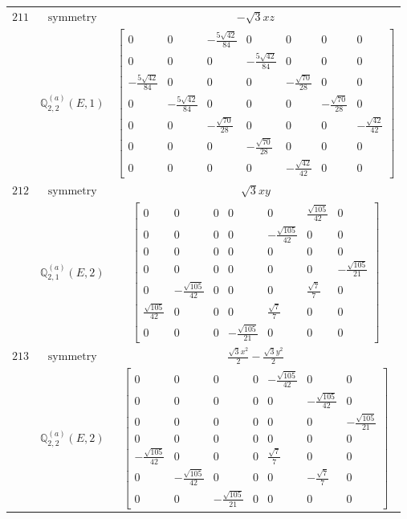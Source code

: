 \documentclass[fleqn,8pt,landscape]{jsarticle}
\begin{document}
\begin{longtable}{ccc}
$ 211 $ & $ \text{symmetry} $ & $ - \sqrt{3} x z $ \\
$  $ & $ \mathbb{Q}_{2,2}^{(a)}(E,1) $ & $ \begin{bmatrix} 0 & 0 & - \frac{5 \sqrt{42}}{84} & 0 & 0 & 0 & 0 \\ 0 & 0 & 0 & - \frac{5 \sqrt{42}}{84} & 0 & 0 & 0 \\ - \frac{5 \sqrt{42}}{84} & 0 & 0 & 0 & - \frac{\sqrt{70}}{28} & 0 & 0 \\ 0 & - \frac{5 \sqrt{42}}{84} & 0 & 0 & 0 & - \frac{\sqrt{70}}{28} & 0 \\ 0 & 0 & - \frac{\sqrt{70}}{28} & 0 & 0 & 0 & - \frac{\sqrt{42}}{42} \\ 0 & 0 & 0 & - \frac{\sqrt{70}}{28} & 0 & 0 & 0 \\ 0 & 0 & 0 & 0 & - \frac{\sqrt{42}}{42} & 0 & 0 \end{bmatrix} $ \\ \hline
$ 212 $ & $ \text{symmetry} $ & $ \sqrt{3} x y $ \\
$  $ & $ \mathbb{Q}_{2,1}^{(a)}(E,2) $ & $ \begin{bmatrix} 0 & 0 & 0 & 0 & 0 & \frac{\sqrt{105}}{42} & 0 \\ 0 & 0 & 0 & 0 & - \frac{\sqrt{105}}{42} & 0 & 0 \\ 0 & 0 & 0 & 0 & 0 & 0 & 0 \\ 0 & 0 & 0 & 0 & 0 & 0 & - \frac{\sqrt{105}}{21} \\ 0 & - \frac{\sqrt{105}}{42} & 0 & 0 & 0 & \frac{\sqrt{7}}{7} & 0 \\ \frac{\sqrt{105}}{42} & 0 & 0 & 0 & \frac{\sqrt{7}}{7} & 0 & 0 \\ 0 & 0 & 0 & - \frac{\sqrt{105}}{21} & 0 & 0 & 0 \end{bmatrix} $ \\ \hline
$ 213 $ & $ \text{symmetry} $ & $ \frac{\sqrt{3} x^{2}}{2} - \frac{\sqrt{3} y^{2}}{2} $ \\
$  $ & $ \mathbb{Q}_{2,2}^{(a)}(E,2) $ & $ \begin{bmatrix} 0 & 0 & 0 & 0 & - \frac{\sqrt{105}}{42} & 0 & 0 \\ 0 & 0 & 0 & 0 & 0 & - \frac{\sqrt{105}}{42} & 0 \\ 0 & 0 & 0 & 0 & 0 & 0 & - \frac{\sqrt{105}}{21} \\ 0 & 0 & 0 & 0 & 0 & 0 & 0 \\ - \frac{\sqrt{105}}{42} & 0 & 0 & 0 & \frac{\sqrt{7}}{7} & 0 & 0 \\ 0 & - \frac{\sqrt{105}}{42} & 0 & 0 & 0 & - \frac{\sqrt{7}}{7} & 0 \\ 0 & 0 & - \frac{\sqrt{105}}{21} & 0 & 0 & 0 & 0 \end{bmatrix} $ \\ \hline

\end{longtable}
\end{document}
